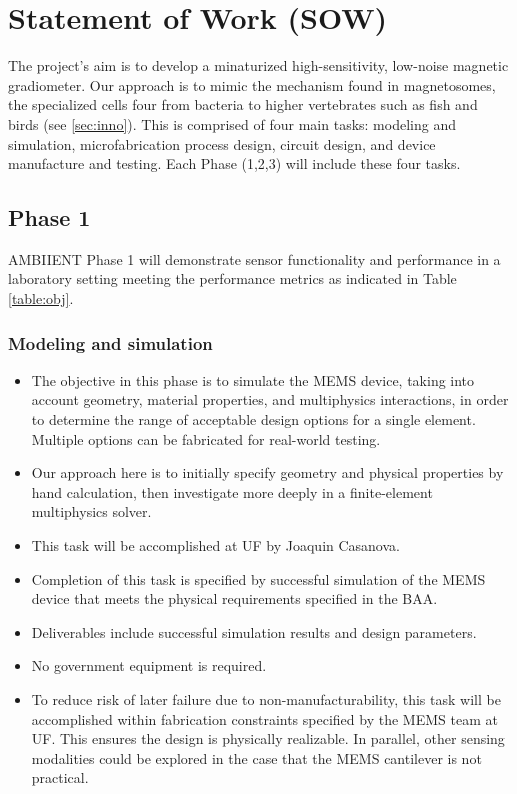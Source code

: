 
\section{Statement of Work (SOW)}
The project's aim is to develop a minaturized high-sensitivity, low-noise magnetic gradiometer. Our approach is to mimic the mechanism found in magnetosomes, the specialized cells four from bacteria to higher vertebrates such as fish and birds (see \ref{sec:inno}). This is comprised of four main tasks: modeling and simulation, microfabrication process design, circuit design, and device manufacture and testing. Each Phase (1,2,3) will include these four tasks.

\subsection{Phase 1}

AMBIIENT Phase 1 will demonstrate sensor functionality and performance in a laboratory
setting meeting the performance metrics as indicated in Table \ref{table:obj}. 

\subsubsection{Modeling and simulation}\label{sec:p1:em}
\begin{itemize}
\item The objective in this phase is to simulate the MEMS device, taking into account geometry, material properties, and multiphysics interactions, in order to determine the range of acceptable design options for a single element. Multiple options can be fabricated for real-world testing. 
\item Our approach here is to initially specify geometry and physical properties by hand calculation, then investigate more deeply in a finite-element multiphysics solver.
\item This task will be accomplished at UF by Joaquin Casanova.
\item Completion of this task is specified by successful simulation of the MEMS device that meets the physical requirements specified in the BAA.
\item Deliverables include successful simulation results and design parameters.
\item No government equipment is required.
\item To reduce risk of later failure due to non-manufacturability, this task will be accomplished within fabrication constraints specified by the MEMS team at UF. This ensures the design is physically realizable. In parallel, other sensing modalities could be explored in the case that the MEMS cantilever is not practical.
\end{itemize}
